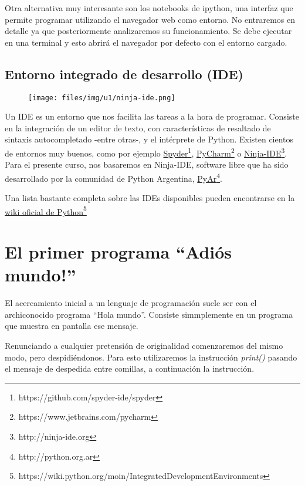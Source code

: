 \documentclass[letterpaper,10pt,spanish]{sphinxmanual}
\begin{document}
Otra alternativa muy interesante son los notebooks de ipython, una
interfaz que permite programar utilizando el navegador web como entorno.
No entraremos en detalle ya que posteriormente analizaremos su
funcionamiento. Se debe ejecutar en una terminal  y
esto abrirá el navegador por defecto con el entorno cargado.


\subsection{Entorno integrado de desarrollo (IDE)}
\label{Unidad01:entorno-integrado-de-desarrollo-ide}\begin{figure}[htbp]
\centering

\texttt{[image: files/img/u1/ninja-ide.png]}
\end{figure}

Un IDE es un entorno que nos facilita las tareas a la hora de programar.
Consiste en la integración de un editor de texto, con características de
resaltado de sintaxis autocompletado -entre otras-, y el intérprete de
Python. Existen cientos de entornos muy buenos, como por ejemplo
\href{https://github.com/spyder-ide/spyder}{Spyder}\footnote{https://github.com/spyder-ide/spyder},
\href{https://www.jetbrains.com/pycharm}{PyCharm}\footnote{https://www.jetbrains.com/pycharm} o
\href{http://ninja-ide.org}{Ninja-IDE}\footnote{http://ninja-ide.org}. Para el presente curso, nos
basaremos en Ninja-IDE, software libre que ha sido desarrollado por la
comunidad de Python Argentina, \href{http://python.org.ar}{PyAr}\footnote{http://python.org.ar}.

Una lista bastante completa sobre las IDEs disponibles pueden
encontrarse en la \href{https://wiki.python.org/moin/IntegratedDevelopmentEnvironments}{wiki oficial de
Python}\footnote{https://wiki.python.org/moin/IntegratedDevelopmentEnvironments}


\section{El primer programa ``Adiós mundo!''}
\label{Unidad01:el-primer-programa-adios-mundo}
El acercamiento inicial a un lenguaje de programación suele ser con el
archiconocido programa ``Hola mundo''. Consiste simmplemente en un
programa que muestra en pantalla ese mensaje.

Renunciando a cualquier pretensión de originalidad comenzaremos del
mismo modo, pero despidiéndonos. Para esto utilizaremos la instrucción
\emph{print()} pasando el mensaje de despedida entre comillas, a continuación
la instrucción.
\end{document}
